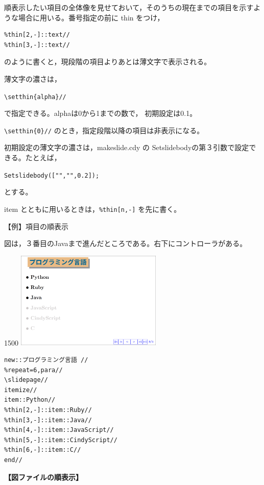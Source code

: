 \documentclass[papersize,a4paper,12pt,uplatex]{jsarticle}
\begin{document}
 順表示したい項目の全体像を見せておいて，そのうちの現在までの項目を示すような場合に用いる。番号指定の前に thin をつけ，
 
 \begin{verbatim}
%thin[2,-]::text//
%thin[3,-]::text//
\end{verbatim}

のように書くと，現段階の項目よりあとは薄文字で表示される。
 
薄文字の濃さは，

\hspace{10mm} \verb|\setthin{alpha}//|

で指定できる。alphaは0から1までの数で， 初期設定は0.1。

\verb|\setthin{0}//| のとき，指定段階以降の項目は非表示になる。

 初期設定の薄文字の濃さは，makeslide.cdy の Setslidebodyの第３引数で設定できる。たとえば，

\hspace{10mm}\verb|Setslidebody(["","",0.2]);|

とする。

item とともに用いるときは，\verb|%thin[n,-]| を先に書く。

\vspace{\baselineskip}
【例】項目の順表示

図は，３番目のJavaまで進んだところである。右下にコントローラがある。

\begin{layer}{150}{0}
 {\includegraphics[bb=0.00 0.00 777.04 516.03,width=7cm]{Fig/sliderepeat.pdf} }
\end{layer}
\begin{verbatim}
new::プログラミング言語 //
%repeat=6,para// 
\slidepage// 
itemize// 
item::Python// 
%thin[2,-]::item::Ruby// 
%thin[3,-]::item::Java// 
%thin[4,-]::item::JavaScript// 
%thin[5,-]::item::CindyScript// 
%thin[6,-]::item::C// 
end// 
\end{verbatim}

\vspace{\baselineskip}
 {\bf 【図ファイルの順表示】}
 
\end{document}
